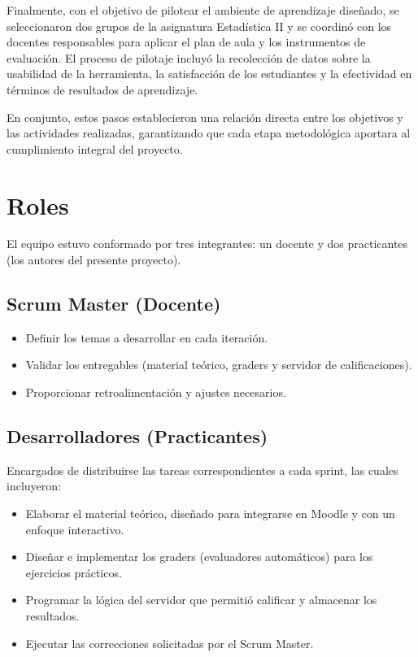 \documentclass[letter,oneside,12pt,spanish]{report}
\begin{document}
Finalmente, con el objetivo de pilotear el ambiente de aprendizaje diseñado, se seleccionaron dos grupos de la asignatura Estadística II y se coordinó con los docentes responsables para aplicar el plan de aula y los instrumentos de evaluación. El proceso de pilotaje incluyó la recolección de datos sobre la usabilidad de la herramienta, la satisfacción de los estudiantes y la efectividad en términos de resultados de aprendizaje.

En conjunto, estos pasos establecieron una relación directa entre los objetivos y las actividades realizadas, garantizando que cada etapa metodológica aportara al cumplimiento integral del proyecto.

\section{Roles}

El equipo estuvo conformado por tres integrantes: un docente y dos practicantes (los autores del presente proyecto).

\subsection*{Scrum Master (Docente)}
\begin{itemize}[leftmargin=*]
	\item Definir los temas a desarrollar en cada iteración.
	\item Validar los entregables (material teórico, graders y servidor de calificaciones).
	\item Proporcionar retroalimentación y ajustes necesarios.
\end{itemize}

\subsection*{Desarrolladores (Practicantes)}
Encargados de distribuirse las tareas correspondientes a cada sprint, las cuales incluyeron:
\begin{itemize}[leftmargin=*]
	\item Elaborar el material teórico, diseñado para integrarse en Moodle y con un enfoque interactivo.
	\item Diseñar e implementar los graders (evaluadores automáticos) para los ejercicios prácticos.
	\item Programar la lógica del servidor que permitió calificar y almacenar los resultados.
	\item Ejecutar las correcciones solicitadas por el Scrum Master.
\end{itemize}
\end{document}
